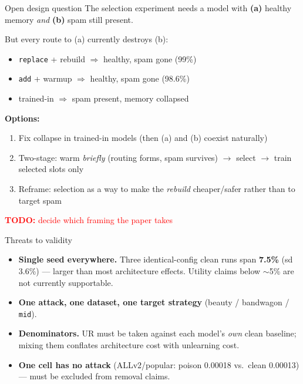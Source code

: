 \documentclass{beamer}
\newcommand{\todo}[1]{\textcolor{red}{\textbf{TODO:} #1}}
\begin{document}
\begin{frame}{Open design question}
The selection experiment needs a model with
\textbf{(a)} healthy memory \emph{and} \textbf{(b)} spam still present.

\medskip
But every route to (a) currently destroys (b):
\begin{itemize}
  \item \texttt{replace} + rebuild $\Rightarrow$ healthy, spam gone (99\%)
  \item \texttt{add} + warmup $\Rightarrow$ healthy, spam gone (98.6\%)
  \item trained-in $\Rightarrow$ spam present, memory collapsed
\end{itemize}

\medskip
\textbf{Options:}
\begin{enumerate}
  \item Fix collapse in trained-in models (then (a) and (b) coexist naturally)
  \item Two-stage: warm \emph{briefly} (routing forms, spam survives)
        $\rightarrow$ select $\rightarrow$ train selected slots only
  \item Reframe: selection as a way to make the \emph{rebuild} cheaper/safer
        rather than to target spam
\end{enumerate}

\medskip
\todo{decide which framing the paper takes}
\end{frame}

\begin{frame}{Threats to validity}
\begin{itemize}
  \item \textbf{Single seed everywhere.} Three identical-config clean runs span
        \textbf{7.5\%} (sd 3.6\%) --- larger than most architecture effects.
        Utility claims below $\sim$5\% are not currently supportable.
  \item \textbf{One attack, one dataset, one target strategy}
        (beauty / bandwagon / \texttt{mid}).
  \item \textbf{Denominators.} UR must be taken against each model's \emph{own}
        clean baseline; mixing them conflates architecture cost with unlearning
        cost.
  \item \textbf{One cell has no attack} (ALLv2/popular: poison 0.00018 vs.\
        clean 0.00013) --- must be excluded from removal claims.
\end{itemize}
\end{frame}
\end{document}
